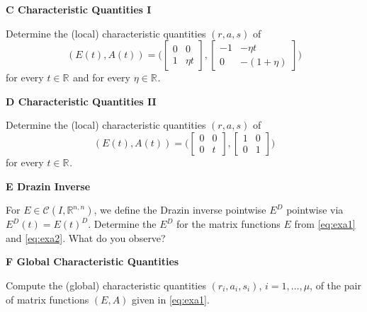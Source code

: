 \documentclass[a4paper,10pt]{article}
\begin{document}
{\bf C Characteristic Quantities I}

Determine the (local) characteristic quantities $(r, a, s)$ of 
\begin{equation}\label{eq:exa1}
	(E(t), A(t)) = \bigl ( \begin{bmatrix} 0 &0 \\ 1 &\eta t \end{bmatrix},
\begin{bmatrix} -1 &-\eta t  \\ 0 & -(1+\eta) \end{bmatrix}\bigr )
\end{equation}
for every $t\in\mathbb R^{}$ and for every $\eta \in \mathbb R^{}$.  
\smallskip

{\bf D Characteristic Quantities II}

Determine the (local) characteristic quantities $(r, a, s)$ of 
\begin{equation}\label{eq:exa2}
	(E(t), A(t)) = \bigl ( \begin{bmatrix} 0 &0 \\ 0 & t \end{bmatrix},
\begin{bmatrix} 1 & 0  \\ 0 & 1 \end{bmatrix}\bigr )
\end{equation}
for every $t\in\mathbb R^{}$.
\smallskip

{\bf E Drazin Inverse}

For $E\in\mathcal C(I,\mathbb R^{n,n})$, we define the Drazin inverse pointwise $E^D$ pointwise via $E^D(t)=E(t)^D$. Determine the $E^D$ for the matrix functions $E$ from \eqref{eq:exa1} and \eqref{eq:exa2}. What do you observe?
\smallskip

{\bf F Global Characteristic Quantities}

Compute the (global) characteristic quantities $(r_i, a_i, s_i)$, $i=1,\dots,\mu$, of the pair of matrix functions $(E,A)$ given in \eqref{eq:exa1}.
\end{document}
